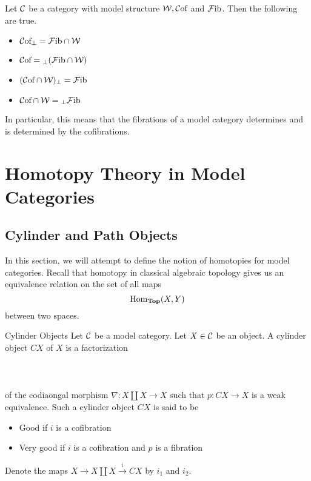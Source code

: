 \documentclass[a4paper]{article}
\begin{document}
\begin{thm}{}{} Let $\mathcal{C}$ be a category with model structure $\mathcal{W},\mathcal{C}\text{of}$ and $\mathcal{F}\text{ib}$. Then the following are true. 
\begin{itemize}
\item $\mathcal{C}\text{of}_\perp=\mathcal{F}\text{ib}\cap\mathcal{W}$
\item $\mathcal{C}\text{of}={_\perp(\mathcal{F}\text{ib}\cap\mathcal{W})}$
\item $(\mathcal{C}\text{of}\cap\mathcal{W})_\perp=\mathcal{F}\text{ib}$
\item $\mathcal{C}\text{of}\cap\mathcal{W}={_\perp\mathcal{F}\text{ib}}$
\end{itemize}
In particular, this means that the fibrations of a model category determines and is determined by the cofibrations. 
\end{thm}

\pagebreak
\section{Homotopy Theory in Model Categories}
\subsection{Cylinder and Path Objects}
In this section, we will attempt to define the notion of homotopies for model categories. Recall that homotopy in classical algebraic topology gives us an equivalence relation on the set of all maps $$\operatorname{Hom}_{\bold{Top}}(X,Y)$$ between two spaces. 

\begin{defn}{Cylinder Objects}{} Let $\mathcal{C}$ be a model category. Let $X\in\mathcal{C}$ be an object. A cylinder object $CX$ of $X$ is a factorization \\~\\
\\~\\
of the codiaongal morphism $\nabla:X\coprod X\to X$ such that $p:CX\to X$ is a weak equivalence. Such a cylinder object $CX$ is said to be 
\begin{itemize}
\item Good if $i$ is a cofibration
\item Very good if $i$ is a cofibration and $p$ is a fibration
\end{itemize}
Denote the maps $X\to X\coprod X\overset{i}{\longrightarrow}CX$ by $i_1$ and $i_2$. 
\end{defn}
\end{document}
